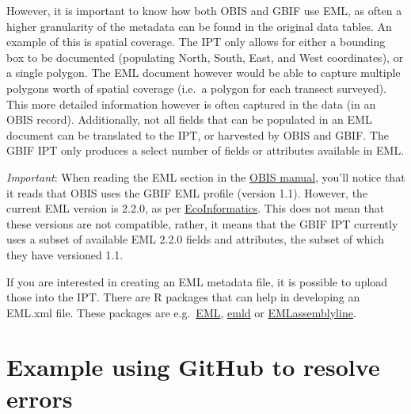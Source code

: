 \documentclass[
]{book}
\begin{document}
However, it is important to know how both OBIS and GBIF use EML, as often a higher granularity of the metadata can be found in the original data tables. An example of this is spatial coverage. The IPT only allows for either a bounding box to be documented (populating North, South, East, and West coordinates), or a single polygon. The EML document however would be able to capture multiple polygons worth of spatial coverage (i.e.~a polygon for each transect surveyed). This more detailed information however is often captured in the data (in an OBIS record). Additionally, not all fields that can be populated in an EML document can be translated to the IPT, or harvested by OBIS and GBIF. The GBIF IPT only produces a select number of fields or attributes available in EML.

\emph{Important}: When reading the EML section in the \href{https://obis.org/manual/eml/}{OBIS manual}, you'll notice that it reads that OBIS uses the GBIF EML profile (version 1.1). However, the current EML version is 2.2.0, as per \href{https://eml.ecoinformatics.org/}{EcoInformatics}. This does not mean that these versions are not compatible, rather, it means that the GBIF IPT currently uses a subset of available EML 2.2.0 fields and attributes, the subset of which they have versioned 1.1.

If you are interested in creating an EML metadata file, it is possible to upload those into the IPT. There are R packages that can help in developing an EML.xml file. These packages are e.g.~\href{https://github.com/ropensci/EML}{EML}, \href{https://github.com/ropensci/emld}{emld} or \href{https://ediorg.github.io/EMLassemblyline/articles/overview.html}{EMLassemblyline}.

\hypertarget{example-using-github-to-resolve-errors}{%
\section{Example using GitHub to resolve errors}\label{example-using-github-to-resolve-errors}}
\end{document}
